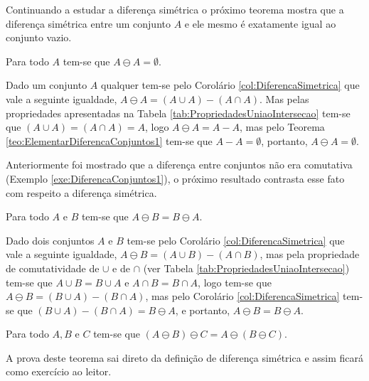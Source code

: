 Continuando a estudar a diferença simétrica o próximo teorema mostra que a diferença simétrica entre um conjunto $A$ e ele mesmo é exatamente igual ao conjunto vazio.

\begin{teorema}
  Para todo $A$ tem-se que $A \ominus A = \emptyset$.
\end{teorema}

\begin{prova}
	Dado um conjunto $A$ qualquer tem-se pelo Corolário \ref{col:DiferencaSimetrica} que vale a seguinte igualdade,  $A \ominus A = (A \cup A) - (A \cap A)$. Mas pelas propriedades apresentadas na Tabela \ref{tab:PropriedadesUniaoIntersecao} tem-se que $(A \cup A) = (A \cap A) = A$, logo $A \ominus A =  A - A$, mas pelo Teorema \ref{teo:ElementarDiferencaConjuntos1} tem-se que $A - A = \emptyset$, portanto, $A \ominus A = \emptyset$.
\end{prova}

Anteriormente foi mostrado que a diferença entre conjuntos não era comutativa (Exemplo \ref{exe:DiferencaConjuntos1}), o próximo resultado contrasta esse fato com respeito a diferença simétrica.

\begin{teorema}
	Para todo $A$ e $B$ tem-se que $A \ominus B = B \ominus A$.
\end{teorema}

\begin{prova}
	Dado dois conjuntos $A$ e $B$ tem-se pelo Corolário \ref{col:DiferencaSimetrica} que vale a seguinte igualdade,  $A \ominus B = (A \cup B) - (A \cap B)$, mas pela propriedade de comutatividade de $\cup$ e de $\cap$ (ver Tabela \ref{tab:PropriedadesUniaoIntersecao}) tem-se que $A \cup B = B \cup A$ e $A \cap B = B \cap A$, logo tem-se que $A \ominus B = (B \cup A) - (B \cap A)$, mas pelo Corolário \ref{col:DiferencaSimetrica} tem-se que $(B \cup A) - (B \cap A) = B \ominus A$, e portanto, $A \ominus B = B \ominus A$.
\end{prova}

\begin{teorema}
	Para todo $A, B$ e $C$ tem-se que $(A \ominus B) \ominus C = A \ominus (B \ominus C)$.
\end{teorema}

\begin{prova}
	A prova deste teorema sai direto da definição de diferença simétrica e assim ficará como exercício ao leitor.
\end{prova}

